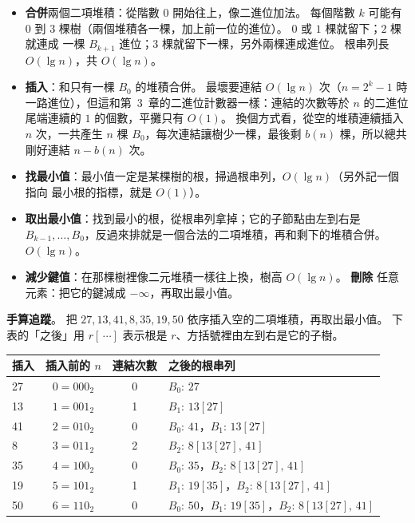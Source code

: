 \begin{itemize}
\item \textbf{合併}兩個二項堆積：從階數 $0$ 開始往上，像二進位加法。 每個階數 $k$ 可能有
$0$ 到 $3$ 棵樹（兩個堆積各一棵，加上前一位的進位）。 $0$ 或 $1$ 棵就留下；$2$ 棵就連成
一棵 $B_{k+1}$ 進位；$3$ 棵就留下一棵，另外兩棵連成進位。 根串列長 $O(\lg n)$，共
$O(\lg n)$。
\item \textbf{插入}：和只有一棵 $B_0$ 的堆積合併。 最壞要連結 $O(\lg n)$ 次（$n = 2^k - 1$
時一路進位），但這和第~3~章的二進位計數器一樣：連結的次數等於 $n$ 的二進位尾端連續的
$1$ 的個數，平攤只有 $O(1)$。 換個方式看，從空的堆積連續插入 $n$ 次，一共產生 $n$ 棵
$B_0$，每次連結讓樹少一棵，最後剩 $b(n)$ 棵，所以總共剛好連結 $n - b(n)$ 次。
\item \textbf{找最小值}：最小值一定是某棵樹的根，掃過根串列，$O(\lg n)$（另外記一個指向
最小根的指標，就是 $O(1)$）。
\item \textbf{取出最小值}：找到最小的根，從根串列拿掉；它的子節點由左到右是
$B_{k-1}, \ldots, B_0$，反過來排就是一個合法的二項堆積，再和剩下的堆積合併。
$O(\lg n)$。
\item \textbf{減少鍵值}：在那棵樹裡像二元堆積一樣往上換，樹高 $O(\lg n)$。 \textbf{刪除}
任意元素：把它的鍵減成 $-\infty$，再取出最小值。
\end{itemize}

\textbf{手算追蹤}。 把 $27, 13, 41, 8, 35, 19, 50$ 依序插入空的二項堆積，再取出最小值。
下表的「之後」用 $r[\,\cdots]$ 表示根是 $r$、方括號裡由左到右是它的子樹。

\begin{center}
\begin{tabular}{lccl}
\toprule
插入 & 插入前的 $n$ & 連結次數 & 之後的根串列 \\
\midrule
27 & $0 = 000_2$ & 0 & $B_0{:}\,27$ \\
13 & $1 = 001_2$ & 1 & $B_1{:}\,13[27]$ \\
41 & $2 = 010_2$ & 0 & $B_0{:}\,41$，$B_1{:}\,13[27]$ \\
8 & $3 = 011_2$ & 2 & $B_2{:}\,8[13[27],\,41]$ \\
35 & $4 = 100_2$ & 0 & $B_0{:}\,35$，$B_2{:}\,8[13[27],\,41]$ \\
19 & $5 = 101_2$ & 1 & $B_1{:}\,19[35]$，$B_2{:}\,8[13[27],\,41]$ \\
50 & $6 = 110_2$ & 0 & $B_0{:}\,50$，$B_1{:}\,19[35]$，$B_2{:}\,8[13[27],\,41]$ \\
\bottomrule
\end{tabular}
\end{center}

